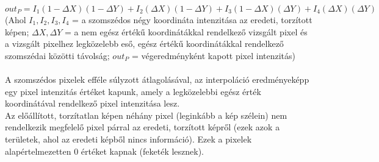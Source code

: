 \documentclass[12pt]{report}
\begin{document}
\begin{enumerate}
\begin{itemize}
                        \[out_P = I_1(1 - \Delta X)(1 - \Delta Y) + I_2 (\Delta X)(1 - \Delta Y) + I_3(1 - \Delta X)(\Delta Y) + I_4(\Delta X)(\Delta Y)\]
                        (Ahol $I_1, I_2, I_3, I_4$ = a szomszédos négy koordináta intenzitása az eredeti, torzított képen; $\Delta X, \Delta Y$ = a nem egész értékű koordinátákkal rendelkező vizsgált pixel és a vizsgált pixelhez legközelebb eső, egész értékű koordinátákkal rendelkező szomszédai közötti távolság; $out_P$ = végeredményként kapott pixel intenzitás)\\\\
                    A szomszédos pixelek efféle súlyzott átlagolásával, az interpoláció eredményeképp egy pixel intenzitás értéket kapunk, amely a legközelebbi egész érték koordinátával rendelkező pixel intenzitása lesz.\\
                    Az előállított, torzítatlan képen néhány pixel (leginkább a kép szélein) nem rendelkezik megfelelő pixel párral az eredeti, torzított képről (ezek azok a területek, ahol az eredeti képből nincs információ). Ezek a pixelek alapértelmezetten 0 értéket kapnak (feketék lesznek). 
                        \end{itemize}
                \end{enumerate}
\end{document}
